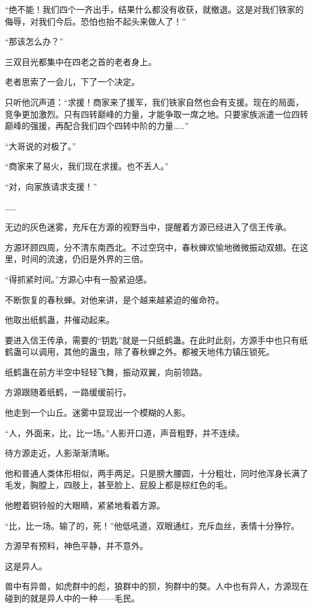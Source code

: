 \begin{this_body}
“绝不能！我们四个一齐出手，结果什么都没有收获，就撤退。这是对我们铁家的侮辱，对我们今后。恐怕也抬不起头来做人了！”

“那该怎么办？”

三双目光都集中在四老之首的老者身上。

老者思索了一会儿，下了一个决定。

只听他沉声道：“求援！商家来了援军，我们铁家自然也会有支援。现在的局面，竞争更加激烈。只有四转巅峰的力量，才能争取一席之地。只要家族派遣一位四转巅峰的强援，再配合我们四个四转中阶的力量……”

“大哥说的对极了。”

“商家来了易火，我们现在求援。也不丢人。”

“对，向家族请求支援！”

……

无边的灰色迷雾，充斥在方源的视野当中，提醒着方源已经进入了信王传承。

方源环顾四周，分不清东南西北。不过空窍中，春秋蝉欢愉地微微振动双翅。在这里，时间的流速，仍旧是外界的三倍。

“得抓紧时间。”方源心中有一股紧迫感。

不断恢复的春秋蝉。对他来讲，是个越来越紧迫的催命符。

他取出纸鹤蛊，并催动起来。

要进入信王传承，需要的“钥匙”就是一只纸鹤蛊。在此时此刻，方源手中也只有纸鹤蛊可以调用，其他的蛊虫，除了春秋蝉之外。都被天地伟力镇压锁死。

纸鹤蛊在前方半空中轻轻飞舞，振动双翼，向前领路。

方源跟随着纸鹤，一路缓缓前行。

他走到一个山丘。迷雾中显现出一个模糊的人影。

“人，外面来，比，比一场。”人影开口道，声音粗野，并不连续。

待方源走近，人影渐渐清晰。

他和普通人类体形相似，两手两足。只是膀大腰圆，十分粗壮，同时他浑身长满了毛发，胸膛上，四肢上，甚至脸上、屁股上都是棕红色的毛。

他瞪着铜铃般的大眼睛，紧紧地看着方源。

“比，比一场。输了的，死！”他低吼道，双眼通红，充斥血丝，表情十分狰狞。

方源早有预料，神色平静，并不意外。

这是异人。

兽中有异兽，如虎群中的彪，狼群中的狈，狗群中的獒。人中也有异人，方源现在碰到的就是异人中的一种——毛民。


\end{this_body}
